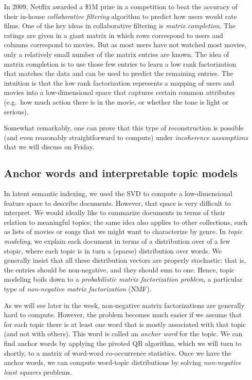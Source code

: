 \documentclass[12pt, leqno]{article} %
\begin{document}
In 2009, Netflix awarded a \$1M prize in a competition to beat the
accuracy of their in-house {\em collaborative filtering} algorithm to
predict how users would rate films.  One of the key ideas in
collaborative filtering is {\em matrix completion}.  The ratings are
given in a giant matrix in which rows correspond to users and columns
correspond to movies.  But as most users have not watched most movies,
only a relatively small number of the matrix entries are known.  The
idea of matrix completion is to use those few entries to learn a low
rank factorization that matches the data and can be used to predict
the remaining entries.  The intuition is that the low rank
factorization represents a mapping of users and movies into a
low-dimensional space that captures certain common attributes
(e.g.~how much action there is in the movie, or whether the tone is
light or serious).

Somewhat remarkably, one can prove that this type of reconstruction is
possible (and even reasonably straightforward to compute)
under {\em incoherence assumptions} that we will discuss on Friday.

\subsection{Anchor words and interpretable topic models}

In latent semantic indexing, we used the SVD to compute a
low-dimensional feature space to describe documents.  However, that
space is very difficult to interpret.  We would ideally like to
summarize documents in terms of their relation to meaningful topics;
the same idea also applies to other collections, such as lists of
movies or songs that we might want to characterize by genre.  In {\em
  topic modeling}, we explain each document in terms of a distribution
over of a few stopic, where each topic is in turn a (sparse)
distribution over words.  We generally insist that all these
distribution vectors are properly stochastic: that is, the entries
should be non-negative, and they should sum to one.  Hence, topic
modeling boils down to a {\em probabilistic matrix factorization
  problem}, a particular type of {\em non-negative matrix
  factorization} (NMF).

As we will see later in the week, non-negative matrix factorizations
are generally hard to compute.  However, the problem becomes much
easier if we assume that for each topic there is at least one word
that is mostly associated with that topic (and not with others).  This
word is called an {\em anchor word} for the topic.
We can find anchor words by applying the pivoted QR algorithm, which we will
turn to shortly, to a matrix of word-word co-occurrence statistics.
Once we have the anchor words, we can compute
word-topic distributions by solving {\em non-negative least squares} problems.
\end{document}
